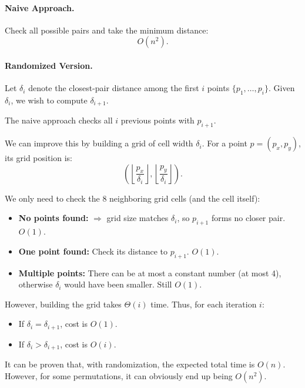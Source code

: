 \documentclass{article}
\begin{document}
\paragraph{Naive Approach.}
Check all possible pairs and take the minimum distance:
\[
O(n^2).
\]

\paragraph{Randomized Version.}
Let $\delta_i$ denote the closest-pair distance among the first $i$ points 
$\{p_1, \dots, p_i\}$.  
Given $\delta_i$, we wish to compute $\delta_{i+1}$.

The naive approach checks all $i$ previous points with $p_{i+1}$.

We can improve this by building a grid of cell width $\delta_i$.  
For a point $p = (p_x, p_y)$, its grid position is:
\[
\left(
\left\lfloor \frac{p_x}{\delta_i} \right\rfloor, 
\left\lfloor \frac{p_y}{\delta_i} \right\rfloor
\right).
\]

We only need to check the 8 neighboring grid cells (and the cell itself):

\begin{itemize}
    \item \textbf{No points found:}  
    $\Rightarrow$ grid size matches $\delta_i$, so $p_{i+1}$ forms no closer pair. $O(1)$.
    \item \textbf{One point found:}  
    Check its distance to $p_{i+1}$. $O(1)$.
    \item \textbf{Multiple points:}  
    There can be at most a constant number (at most 4), otherwise $\delta_i$ 
    would have been smaller. Still $O(1)$.
\end{itemize}

However, building the grid takes $\Theta(i)$ time.  
Thus, for each iteration $i$:
\begin{itemize}
    \item If $\delta_i = \delta_{i+1}$, cost is $O(1)$.
    \item If $\delta_i > \delta_{i+1}$, cost is $O(i)$.
\end{itemize}

It can be proven that, with randomization, the expected total time is $O(n)$.  
However, for some permutations, it can obviously end up being $O(n^2)$.
\end{document}
